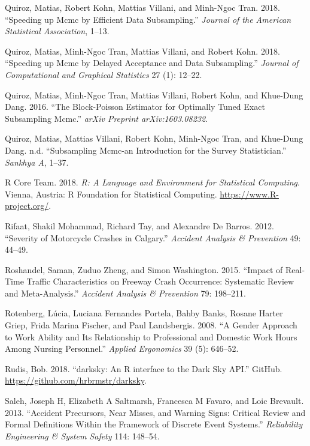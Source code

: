\documentclass[12pt]{book}
\numberwithin{equation}{chapter}
\begin{document}
\leavevmode\hypertarget{ref-quiroz2018speeding1}{}%
Quiroz, Matias, Robert Kohn, Mattias Villani, and Minh-Ngoc Tran. 2018. ``Speeding up Mcmc by Efficient Data Subsampling.'' \emph{Journal of the American Statistical Association}, 1--13.

\leavevmode\hypertarget{ref-quiroz2018speeding}{}%
Quiroz, Matias, Minh-Ngoc Tran, Mattias Villani, and Robert Kohn. 2018. ``Speeding up Mcmc by Delayed Acceptance and Data Subsampling.'' \emph{Journal of Computational and Graphical Statistics} 27 (1): 12--22.

\leavevmode\hypertarget{ref-quiroz2016block}{}%
Quiroz, Matias, Minh-Ngoc Tran, Mattias Villani, Robert Kohn, and Khue-Dung Dang. 2016. ``The Block-Poisson Estimator for Optimally Tuned Exact Subsampling Mcmc.'' \emph{arXiv Preprint arXiv:1603.08232}.

\leavevmode\hypertarget{ref-quirozsubsampling}{}%
Quiroz, Matias, Mattias Villani, Robert Kohn, Minh-Ngoc Tran, and Khue-Dung Dang. n.d. ``Subsampling Mcmc-an Introduction for the Survey Statistician.'' \emph{Sankhya A}, 1--37.

\leavevmode\hypertarget{ref-Rcitation}{}%
R Core Team. 2018. \emph{R: A Language and Environment for Statistical Computing}. Vienna, Austria: R Foundation for Statistical Computing. \url{https://www.R-project.org/}.

\leavevmode\hypertarget{ref-rifaat2012severity}{}%
Rifaat, Shakil Mohammad, Richard Tay, and Alexandre De Barros. 2012. ``Severity of Motorcycle Crashes in Calgary.'' \emph{Accident Analysis \& Prevention} 49: 44--49.

\leavevmode\hypertarget{ref-roshandel2015impact}{}%
Roshandel, Saman, Zuduo Zheng, and Simon Washington. 2015. ``Impact of Real-Time Traffic Characteristics on Freeway Crash Occurrence: Systematic Review and Meta-Analysis.'' \emph{Accident Analysis \& Prevention} 79: 198--211.

\leavevmode\hypertarget{ref-rotenberg2008gender}{}%
Rotenberg, Lúcia, Luciana Fernandes Portela, Bahby Banks, Rosane Harter Griep, Frida Marina Fischer, and Paul Landsbergis. 2008. ``A Gender Approach to Work Ability and Its Relationship to Professional and Domestic Work Hours Among Nursing Personnel.'' \emph{Applied Ergonomics} 39 (5): 646--52.

\leavevmode\hypertarget{ref-hrbrmstr}{}%
Rudis, Bob. 2018. ``darksky: An R interface to the Dark Sky API.'' GitHub. \url{https://github.com/hrbrmstr/darksky}.

\leavevmode\hypertarget{ref-saleh2013accident}{}%
Saleh, Joseph H, Elizabeth A Saltmarsh, Francesca M Favaro, and Loic Brevault. 2013. ``Accident Precursors, Near Misses, and Warning Signs: Critical Review and Formal Definitions Within the Framework of Discrete Event Systems.'' \emph{Reliability Engineering \& System Safety} 114: 148--54.
\end{document}
